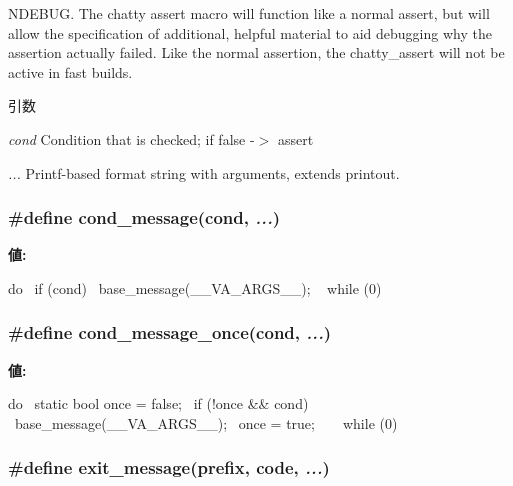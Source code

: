 NDEBUG. The chatty assert macro will function like a normal assert, but will allow the specification of additional, helpful material to aid debugging why the assertion actually failed. Like the normal assertion, the chatty\_\-assert will not be active in fast builds.


\begin{DoxyParams}{引数}
\item[{\em cond}]Condition that is checked; if false -\/$>$ assert \item[{\em ...}]Printf-\/based format string with arguments, extends printout. \end{DoxyParams}
\hypertarget{base_2misc_8hh_a9462d8ae08a9dc81e7a7b8d1dd937aa0}{
\subsubsection[{cond\_\-message}]{\setlength{\rightskip}{0pt plus 5cm}\#define cond\_\-message(cond, \/   {\em ...})}}
\label{base_2misc_8hh_a9462d8ae08a9dc81e7a7b8d1dd937aa0}
{\bfseries 値:}
\begin{DoxyCode}
do {            \
        if (cond)                               \
            base_message(__VA_ARGS__);          \
    } while (0)
\end{DoxyCode}
\hypertarget{base_2misc_8hh_a1240d20e0d7b2f5063f632f444207143}{
\subsubsection[{cond\_\-message\_\-once}]{\setlength{\rightskip}{0pt plus 5cm}\#define cond\_\-message\_\-once(cond, \/   {\em ...})}}
\label{base_2misc_8hh_a1240d20e0d7b2f5063f632f444207143}
{\bfseries 値:}
\begin{DoxyCode}
do {               \
        static bool once = false;                       \
        if (!once && cond) {                            \
            base_message(__VA_ARGS__);                  \
            once = true;                                \
        }                                               \
    } while (0)
\end{DoxyCode}
\hypertarget{base_2misc_8hh_a6b2097421f31dc3c2920ac8a335b8197}{
\subsubsection[{exit\_\-message}]{\setlength{\rightskip}{0pt plus 5cm}\#define exit\_\-message(prefix, \/  code, \/   {\em ...})}}

